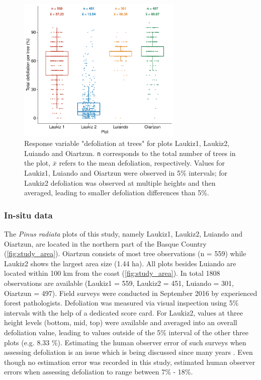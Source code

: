 \documentclass[remotesensing,article,submit,moreauthors,pdftex]{Definitions/mdpi}
\begin{document}
\begin{figure} [t!]
	\centering
	\begin{center}
		\includegraphics[width=0.7\textwidth] {defoliation-distribution-plot-1.pdf}
		\caption{Response variable "defoliation at trees" for plots Laukiz1, Laukiz2, Luiando and Oiartzun. \texttt{n} corresponds to the total number of trees in the plot, $\bar{x}$ refers to the mean defoliation, respectively. Values for Laukiz1, Luiando and Oiartzun were observed in 5\% intervals; for Laukiz2 defoliation was observed at multiple heights and then averaged, leading to smaller defoliation differences than 5\%.}\label{fig:defol-distr}
	\end{center}
\end{figure}

\subsubsection{In-situ data}

The \textit{Pinus radiata} plots of this study, namely Laukiz1, Laukiz2, Luiando and Oiartzun, are located in the northern part of the Basque Country (\autoref{fig:study_area}).
Oiartzun consists of most tree observations (n = 559) while Laukiz2 shows the largest area size (1.44 ha).
All plots besides Luiando are located within 100 km from the coast (\autoref{fig:study_area}).
In total 1808 observations are available (Laukiz1 = 559, Laukiz2 = 451, Luiando = 301, Oiartzun = 497).
Field surveys were conducted in September 2016 by experienced forest pathologists.
Defoliation was measured via visual inspection using 5\% intervals with the help of a dedicated score card.
For Laukiz2, values at three height levels (bottom, mid, top) were available and averaged into an overall defoliation value, leading to values outside of the 5\% interval of the other three plots (e.g. 8.33 \%).
Estimating the human observer error of such surveys when assessing defoliation is an issue which is being discussed since many years \cite{innes1993}.
Even though no estimation error was recorded in this study, \cite{maclean1982} estimated human observer errors when assessing defoliation to range between 7\% - 18\%.
\end{document}
